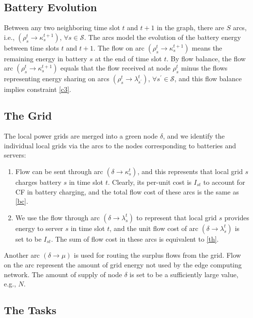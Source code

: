 \documentclass[conference, 10pt, ﬁnal, letterpaper, twocolumn]{IEEEtran}
\begin{document}
\subsection{Battery Evolution}
Between any two neighboring time slot $t$ and $t+1$ in the graph, there are $S$ arcs, i.e., $(\rho^{t}_{s}\rightarrow\kappa^{t+1}_{s})$, $\forall s\in \mathcal{S}$. The arcs model the evolution of the battery energy between time slots $t$ and $t+1$. The flow on arc $(\rho^{t}_{s}\rightarrow \kappa^{t+1}_{s})$ means the remaining energy in battery $s$ at the end of time slot $t$. By flow balance, the flow arc $(\rho^{t}_{s}\rightarrow \kappa^{t+1}_{s})$ equals that the flow received at node $\rho^{t}_{s}$ minus the flows representing energy sharing on arcs $(\rho^{t}_{s}\rightarrow \lambda^{t}_{s^\prime})$, $\forall s^\prime \in \mathcal{S}$, and this flow balance implies constraint \eqref{c3}.

\subsection{The Grid}

The local power grids are merged into a green node $\delta$, and we identify the individual local grids via the arcs to the nodes corresponding to batteries and servers:
\begin{enumerate}
    \item Flow can be sent through arc $(\delta \rightarrow\kappa^{t}_{s})$, and this represents that local grid $s$ charges battery $s$ in time slot $t$. Clearly, its per-unit cost is $I_{st}$ to account for CF in battery charging, and the total flow cost of these arcs is the same as \eqref{bc}.
    \item We use the flow through arc $(\delta \rightarrow \lambda^{t}_{s})$ to represent that local grid $s$ provides energy to server $s$ in time slot $t$, and the unit flow cost of arc $(\delta \rightarrow \lambda^{t}_{s})$ is set to be $I_{st}$. The sum of flow cost in these arcs is equivalent to \eqref{th}.
\end{enumerate}
Another arc $(\delta \rightarrow \mu)$ is used for routing the surplus flows from the grid. Flow on the arc represent the amount of grid energy not used by the edge computing network. The amount of supply of node $\delta$ is set to be a sufficiently large value, e.g., $N$. 

\subsection{The Tasks} \label{sub-D}
\end{document}

